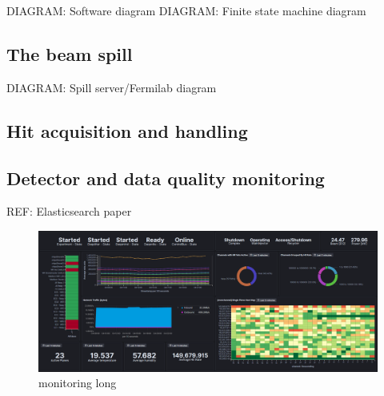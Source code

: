 DIAGRAM: Software diagram
DIAGRAM: Finite state machine diagram

\subsection{The beam spill} %
\label{sec:daq_soft_spill} %

DIAGRAM: Spill server/Fermilab diagram

\subsection{Hit acquisition and handling} %
\label{sec:daq_soft_hits} %

\subsection{Detector and data quality monitoring} %
\label{sec:daq_soft_monitor} %

REF: Elasticsearch paper

\begin{figure} %
    \includegraphics[width=\textwidth]{diagrams/6-daq/monitoring.png}
    \caption[monitoring short]
    {monitoring long}
    \label{fig:monitoring}
\end{figure}
